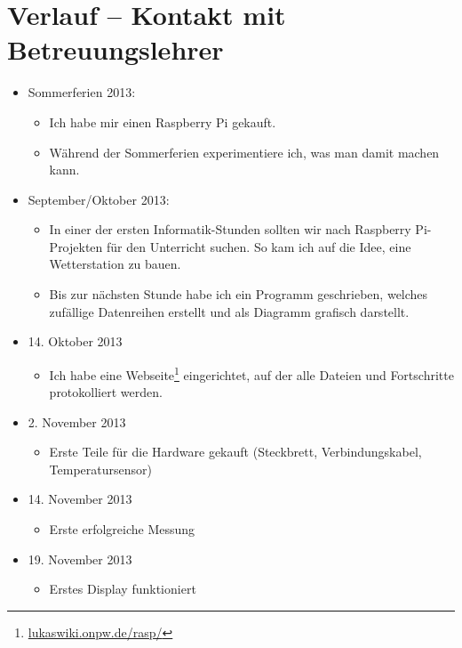 \documentclass[12pt,a4paper,oneside]{scrartcl}
\author{\myauthor}
\title{\mytitle}
\begin{document}
\maketitle

\section{Verlauf -- Kontakt mit Betreuungslehrer}

\begin{itemize}
	\item Sommerferien 2013:
	\begin{itemize}
		\item Ich habe mir einen Raspberry Pi gekauft.
		\item Während der Sommerferien experimentiere ich, was man damit machen kann.
	\end{itemize}
	\item September/Oktober 2013:
	\begin{itemize}
		\item In einer der ersten Informatik-Stunden sollten wir nach Raspberry Pi-Projekten für den Unterricht suchen. So kam ich auf die Idee, eine Wetterstation zu bauen.
		\item Bis zur nächsten Stunde habe ich ein Programm geschrieben, welches zufällige Datenreihen erstellt und als Diagramm grafisch darstellt.
	\end{itemize}
	\item 14. Oktober 2013
	\begin{itemize}
		\item Ich habe eine Webseite\footnote{\href{http://lukaswiki.onpw.de/rasp/}{lukaswiki.onpw.de/rasp/}} eingerichtet, auf der alle Dateien und Fortschritte protokolliert werden.
	\end{itemize}
	\item 2. November 2013
	\begin{itemize}
		\item Erste Teile für die Hardware gekauft (Steckbrett, Verbindungskabel, Temperatursensor)
	\end{itemize}
	\item 14. November 2013
	\begin{itemize}
		\item Erste erfolgreiche Messung
	\end{itemize}
	\item 19. November 2013
	\begin{itemize}
		\item Erstes Display funktioniert

\end{itemize}
\end{itemize}
\end{document}
